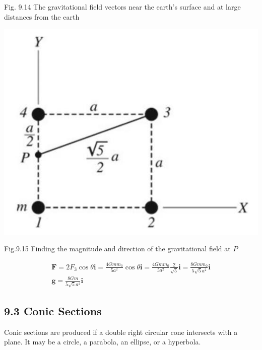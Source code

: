 \documentclass[10pt]{article}
\begin{document}
Fig. 9.14 The gravitational field vectors near the earth's surface and at large distances from the earth

\begin{center}
\includegraphics[max width=\textwidth]{2024_09_13_db1f357d2aad0a03eb2eg-152}
\end{center}

Fig.9.15 Finding the magnitude and direction of the gravitational field at $P$

$$
\begin{gathered}
\mathbf{F}=2 F_{3} \cos \theta \mathbf{i}=\frac{4 G m m_{0}}{5 a^{2}} \cos \theta \mathbf{i}=\frac{4 G m m_{0}}{5 a^{2}} \frac{2}{\sqrt{5}} \mathbf{i}=\frac{8 G m m_{0}}{5 \sqrt{5} a^{2}} \mathbf{i} \\
\mathbf{g}=\frac{8 G m}{5 \sqrt{5} a^{2}} \mathbf{i}
\end{gathered}
$$

\subsection*{9.3 Conic Sections}
Conic sections are produced if a double right circular cone intersects with a plane. It may be a circle, a parabola, an ellipse, or a hyperbola.
\end{document}
